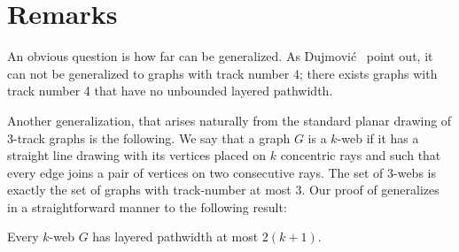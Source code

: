 \documentclass{patmorin}
\begin{document}
\section{Remarks}

An obvious question is how far  can be generalized. As
Dujmovi\'c \etal\ point out, it can not be generalized to graphs with
track number 4; there exists graphs with track number 4 that have no
unbounded layered pathwidth.

Another generalization, that arises naturally from the standard planar
drawing of 3-track graphs is the following. We say that a graph $G$
is a $k$-web if it has a straight line drawing with its vertices placed
on $k$ concentric rays and such that every edge joins a pair of vertices
on two consecutive rays.  The set of 3-webs is exactly the set of graphs
with track-number at most 3.  Our proof of  generalizes in a straightforward manner to the following result:

\begin{thm}
   Every $k$-web $G$ has layered pathwidth at most $2(k+1)$.
\end{thm}
\end{document}
